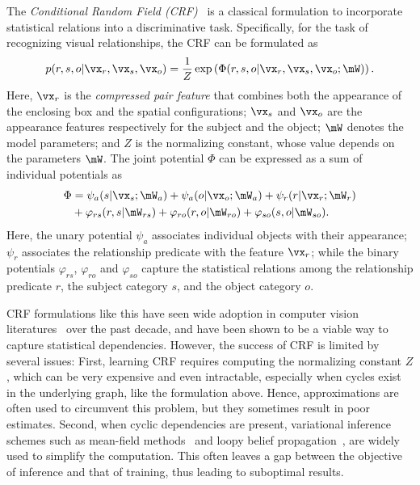 \documentclass[10pt,twocolumn,letterpaper]{article}
\begin{document}
The \emph{Conditional Random Field (CRF)}~\cite{lafferty2001conditional} 
is a classical formulation to incorporate statistical relations into a discriminative task.
Specifically, for the task of recognizing visual relationships, the CRF
can be formulated as
{\small
\begin{equation} \label{eq:crf0}
	p(r, s, o | \vx_r, \vx_s, \vx_o)
	= \frac{1}{Z} \exp \left( \Phi(r, s, o | \vx_r, \vx_s, \vx_o; \mW) \right).
\end{equation}
}
Here, $\vx_r$ is the \emph{compressed pair feature} that combines both the 
appearance of the enclosing box and the spatial configurations;
$\vx_s$ and $\vx_o$ are the appearance features respectively for the subject and the object;
$\mW$ denotes the model parameters;
and $Z$ is the normalizing constant, whose value depends on the parameters $\mW$.
The joint potential $\Phi$ can be expressed as a sum of individual potentials as
{\small
\begin{align} \label{eq:crf1}
	\Phi 
	&= \psi_a(s | \vx_s; \mW_a) 
	 + \psi_a(o | \vx_o; \mW_a) 
	 + \psi_r(r | \vx_r; \mW_r) \notag \\
	&+ \varphi_{rs}(r, s | \mW_{rs})
	 + \varphi_{ro}(r, o | \mW_{ro})
	 + \varphi_{so}(s, o | \mW_{so}).
\end{align}
}
Here, the unary potential $\psi_a$ associates individual objects with their appearance;
$\psi_r$ associates the relationship predicate with the feature $\vx_r$;
while the binary potentials $\varphi_{rs}$, $\varphi_{ro}$ and $\varphi_{so}$ capture 
the statistical relations among the relationship predicate $r$,  
the subject category $s$, and the object category $o$.

CRF formulations like this have seen wide adoption in computer vision literatures~\cite{zheng2015conditional, quattoni2004conditional}
over the past decade, and have been shown to be a viable way to capture statistical dependencies.
However, the success of CRF is limited by several issues:
First, learning CRF requires computing the normalizing constant $Z$, 
which can be very expensive and even intractable, especially when 
cycles exist in the underlying graph, like the formulation above. 
Hence, approximations are often used to circumvent this problem, 
but they sometimes result in poor estimates.
Second, when cyclic dependencies are present, 
variational inference schemes 
such as mean-field methods~\cite{koltun2011efficient} and loopy belief propagation~\cite{pearl1988probabilistic},
are widely used to simplify the computation.
This often leaves a gap between the objective of inference and
that of training, thus leading to suboptimal results. 
\end{document}
